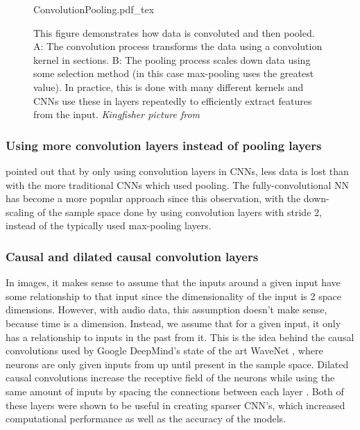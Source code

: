 \documentclass[12pt]{article}
\newcommand{\vectorimage}[1]{
    \def\svgwidth{5.5in}
    {#1.pdf_tex}
}
\begin{document}
	\begin{figure}[h!]
	    \centering
	    \vectorimage{ConvolutionPooling}
	    \caption{This figure demonstrates how data is convoluted and then pooled. A: The convolution process transforms the data using a convolution kernel in sections. B: The pooling process scales down data using some selection method (in this case max-pooling uses the greatest value). In practice, this is done with many different kernels and CNNs use these in layers repeatedly to efficiently extract features from the input. \textit{Kingfisher picture from \parencite{convolutionpooling}}}
	    \label{fig:convolution_pooling}
	\end{figure}
	
	\subsubsection{Using more convolution layers instead of pooling layers}
	\label{sec:strided_conv}
	
	\textcite{Springenberg2014} pointed out that by only using convolution layers in CNNs, less data is lost than with the more traditional CNNs which used pooling. The fully-convolutional NN has become a more popular approach since this observation, with the down-scaling of the sample space done by using convolution layers with stride 2, instead of the typically used max-pooling layers.
	
	\subsubsection{Causal and dilated causal convolution layers}
	\label{sec:dilated_causal_conv}
	
	In images, it makes sense to assume that the inputs around a given input have some relationship to that input since the dimensionality of the input is 2 space dimensions. However, with audio data, this assumption doesn't make sense, because time is a dimension. Instead, we assume that for a given input, it only has a relationship to inputs in the past from it. This is the idea behind the causal convolutions used by Google DeepMind's state of the art WaveNet \parencite{Oord2016}, where neurons are only given inputs from up until present in the sample space. Dilated causal convolutions increase the receptive field of the neurons while using the same amount of inputs by spacing the connections between each layer \parencite{Oord2016}. Both of these layers were shown to be useful in creating sparser CNN's, which increased computational performance as well as the accuracy of the models.
	
\end{document}
